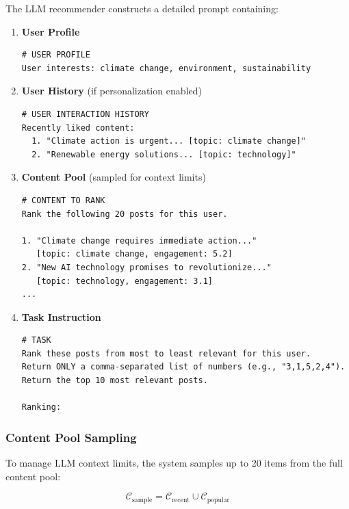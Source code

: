 \documentclass[11pt]{article}
\begin{document}
The LLM recommender constructs a detailed prompt containing:

\begin{enumerate}
    \item \textbf{User Profile}
    \begin{lstlisting}[basicstyle=\small\ttfamily]
# USER PROFILE
User interests: climate change, environment, sustainability
    \end{lstlisting}

    \item \textbf{User History} (if personalization enabled)
    \begin{lstlisting}[basicstyle=\small\ttfamily]
# USER INTERACTION HISTORY
Recently liked content:
  1. "Climate action is urgent... [topic: climate change]"
  2. "Renewable energy solutions... [topic: technology]"
    \end{lstlisting}

    \item \textbf{Content Pool} (sampled for context limits)
    \begin{lstlisting}[basicstyle=\small\ttfamily]
# CONTENT TO RANK
Rank the following 20 posts for this user.

1. "Climate change requires immediate action..."
   [topic: climate change, engagement: 5.2]
2. "New AI technology promises to revolutionize..."
   [topic: technology, engagement: 3.1]
...
    \end{lstlisting}

    \item \textbf{Task Instruction}
    \begin{lstlisting}[basicstyle=\small\ttfamily]
# TASK
Rank these posts from most to least relevant for this user.
Return ONLY a comma-separated list of numbers (e.g., "3,1,5,2,4").
Return the top 10 most relevant posts.

Ranking:
    \end{lstlisting}
\end{enumerate}

\subsubsection{Content Pool Sampling}

To manage LLM context limits, the system samples up to 20 items from the full content pool:

\begin{equation}
\mathcal{C}_{\text{sample}} = \mathcal{C}_{\text{recent}} \cup \mathcal{C}_{\text{popular}}
\end{equation}
\end{document}
